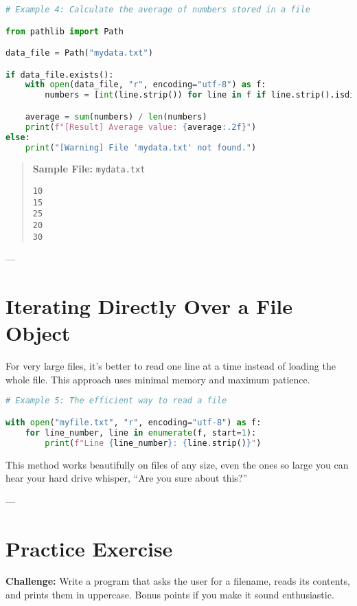 \begin{lstlisting}[language=Python, caption={Computing an average from file data.}]
# Example 4: Calculate the average of numbers stored in a file

from pathlib import Path

data_file = Path("mydata.txt")

if data_file.exists():
    with open(data_file, "r", encoding="utf-8") as f:
        numbers = [int(line.strip()) for line in f if line.strip().isdigit()]

    average = sum(numbers) / len(numbers)
    print(f"[Result] Average value: {average:.2f}")
else:
    print("[Warning] File 'mydata.txt' not found.")
\end{lstlisting}

\begin{quote}
\textbf{Sample File:} \texttt{mydata.txt}
\begin{verbatim}
10
15
25
20
30
\end{verbatim}
\end{quote}

---

\section{Iterating Directly Over a File Object}

For very large files, it’s better to read one line at a time instead of loading the whole file.
This approach uses minimal memory and maximum patience.

\begin{lstlisting}[language=Python, caption={Memory-efficient iteration through a file.}]
# Example 5: The efficient way to read a file

with open("myfile.txt", "r", encoding="utf-8") as f:
    for line_number, line in enumerate(f, start=1):
        print(f"Line {line_number}: {line.strip()}")
\end{lstlisting}

This method works beautifully on files of any size,  
even the ones so large you can hear your hard drive whisper, “Are you sure about this?”

---

\section{Practice Exercise}

\textbf{Challenge:}  
Write a program that asks the user for a filename, reads its contents,  
and prints them in uppercase. Bonus points if you make it sound enthusiastic.


